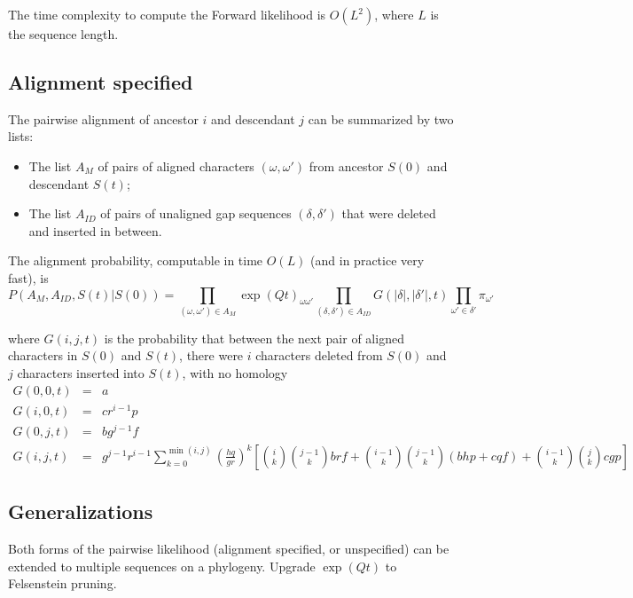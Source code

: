 \documentclass{article}
\begin{document}
The time complexity to compute the Forward likelihood is $O(L^2)$,
where $L$ is the sequence length.

\subsection{Alignment specified}

The pairwise alignment of ancestor $i$ and descendant $j$ can be summarized by two lists:
\begin{itemize}
    \item The list $A_M$ of pairs of aligned characters $(\omega,\omega')$ from ancestor $S(0)$ and descendant $S(t)$;
    \item The list $A_{ID}$ of pairs of unaligned gap sequences $(\delta,\delta')$ that were deleted and inserted in between.
\end{itemize}

The alignment probability, computable in time $O(L)$ (and in practice very fast), is
\[
P(A_M,A_{ID},S(t)|S(0)) =
\prod_{(\omega,\omega') \in A_M} \exp(Qt)_{\omega \omega'}
\prod_{(\delta,\delta') \in A_{ID}} G(|\delta|,|\delta'|,t)
\prod_{\omega'\in \delta'} \pi_{\omega'}
\]

where $G(i,j,t)$ is the probability that between the next pair of aligned characters in $S(0)$ and $S(t)$,
there were $i$ characters deleted from $S(0)$ 
and $j$ characters inserted into $S(t)$,
with no homology
\begin{eqnarray*}
G(0,0,t) & = & a \\
G(i,0,t) & = & cr^{i-1}p \\
G(0,j,t) & = & bg^{j-1}f \\
G(i,j,t) & = &
g^{j-1} r^{i-1}
\sum_{k=0}^{\min(i,j)}
\left(\frac{hq}{gr}\right)^k
\left[
\binom{i}{k} \binom{j-1}{k} brf
+ \binom{i-1}{k} \binom{j-1}{k} (bhp+cqf)
+ \binom{i-1}{k} \binom{j}{k} cgp
\right]
\end{eqnarray*}

\subsection{Generalizations}

Both forms of the pairwise likelihood (alignment specified, or unspecified) can be extended to multiple sequences on a phylogeny.
Upgrade $\exp(Qt)$ to Felsenstein pruning. %
\end{document}
